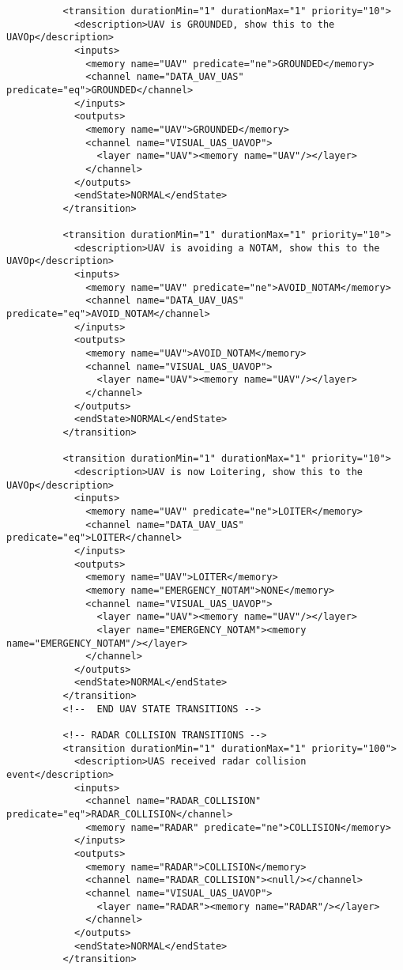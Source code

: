 \begin{verbatim}
          <transition durationMin="1" durationMax="1" priority="10">
            <description>UAV is GROUNDED, show this to the UAVOp</description>
            <inputs>
              <memory name="UAV" predicate="ne">GROUNDED</memory>
              <channel name="DATA_UAV_UAS" predicate="eq">GROUNDED</channel>
            </inputs>
            <outputs>
              <memory name="UAV">GROUNDED</memory>
              <channel name="VISUAL_UAS_UAVOP">
                <layer name="UAV"><memory name="UAV"/></layer>
              </channel>
            </outputs>
            <endState>NORMAL</endState>
          </transition>
          
          <transition durationMin="1" durationMax="1" priority="10">
            <description>UAV is avoiding a NOTAM, show this to the UAVOp</description>
            <inputs>
              <memory name="UAV" predicate="ne">AVOID_NOTAM</memory>
              <channel name="DATA_UAV_UAS" predicate="eq">AVOID_NOTAM</channel>
            </inputs>
            <outputs>
              <memory name="UAV">AVOID_NOTAM</memory>
              <channel name="VISUAL_UAS_UAVOP">
                <layer name="UAV"><memory name="UAV"/></layer>
              </channel>
            </outputs>
            <endState>NORMAL</endState>
          </transition>
          
          <transition durationMin="1" durationMax="1" priority="10">
            <description>UAV is now Loitering, show this to the UAVOp</description>
            <inputs>
              <memory name="UAV" predicate="ne">LOITER</memory>
              <channel name="DATA_UAV_UAS" predicate="eq">LOITER</channel>
            </inputs>
            <outputs>
              <memory name="UAV">LOITER</memory>
              <memory name="EMERGENCY_NOTAM">NONE</memory>
              <channel name="VISUAL_UAS_UAVOP">
                <layer name="UAV"><memory name="UAV"/></layer>
                <layer name="EMERGENCY_NOTAM"><memory name="EMERGENCY_NOTAM"/></layer>
              </channel>
            </outputs>
            <endState>NORMAL</endState>
          </transition>
          <!--  END UAV STATE TRANSITIONS -->
          
          <!-- RADAR COLLISION TRANSITIONS -->
          <transition durationMin="1" durationMax="1" priority="100">
            <description>UAS received radar collision event</description>
            <inputs>
              <channel name="RADAR_COLLISION" predicate="eq">RADAR_COLLISION</channel>
              <memory name="RADAR" predicate="ne">COLLISION</memory>
            </inputs>
            <outputs>
              <memory name="RADAR">COLLISION</memory>
              <channel name="RADAR_COLLISION"><null/></channel>
              <channel name="VISUAL_UAS_UAVOP">
                <layer name="RADAR"><memory name="RADAR"/></layer>
              </channel>
            </outputs>
            <endState>NORMAL</endState>
          </transition>
          

\end{verbatim}
